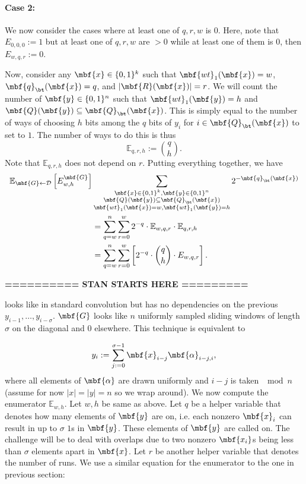 \paragraph{Case 2:} We now consider the cases where at least one of $q,r,w$ is $0$. Here, note that $E_{0,0,0} := 1$ but at least one of $q,r,w$ are $> 0$ while at least one of them is $0$, then $E_{w,q,r} := 0$.  

Now, consider any $\mbf{x} \in \{0,1\}^{k}$ such that $\mbf{wt}_1(\mbf{x}) = w$, $\mbf{q}_{\bt}(\mbf{x}) = q$, and $|\mbf{R}(\mbf{x})| = r$. We will count the number of $\mbf{y} \in \{0,1\}^n$ such that $\mbf{wt}_1(\mbf{y}) = h$ and $\mbf{Q}(\mbf{y}) \subseteq \mbf{Q}_{\bt}(\mbf{x})$. This is simply equal to the number of ways of choosing $h$ bits among the $q$ bits of $y_i$ for $i\in \mbf{Q}_{\bt}(\mbf{x})$ to set to $1$. The number of ways to do this is thus$$\mathbb{E}_{q,r,h} := { q \choose h }.$$Note that $\mathbb{E}_{q,r,h}$ does not depend on $r$. Putting everything together, we have
\begin{align*}
\mathbb{E}_{\mbf{G} \gets \mathcal{D}}\left[E^{\mbf{G}}_{w,h}\right]&\sum_{\substack{\mbf{x} \in \{0,1\}^k, \mbf{y} \in \{0,1\}^n\\\mbf{Q}(\mbf{y}) \subseteq \mbf{Q}_{\bt}(\mbf{x})\\\mbf{wt}_1(\mbf{x}) = w,\mbf{wt}_1(\mbf{y}) = h}}2^{-\mbf{q}_{\bt}(\mbf{x})}\\
&=\sum_{q=w}^{n}\sum_{r=0}^{w}2^{-q} \cdot \mathbb{E}_{w,q,r} \cdot\mathbb{E}_{q,r,h}\\
&=\sum_{q=w}^{n}\sum_{r=0}^{w}\left[2^{-q} \cdot{q \choose h }\cdot E_{w,q,r}\right].
\end{align*}

\iffalse
\newpage
\textbf{========== STAN STARTS HERE =========}

looks like in standard convolution but has no dependencies on the previous $y_{i-1}, \ldots, y_{i-\sigma}$. $\mbf{G}$ looks like $n$ uniformly sampled sliding windows of length $\sigma$ on the diagonal and $0$ elsewhere. This technique is equivalent to

$$y_i := \sum_{j:=0}^{\sigma-1}\mbf{x}_{i-j}\mbf{\alpha}_{i - j,i},$$
where all elements of $\mbf{\alpha}$ are drawn uniformly and $i-j$ is taken $\mod n$ (assume for now $|x|=|y|=n$ so we wrap around). We now compute the enumerator $\mathbb{E}_{w,h}$. Let $w,h$ be same as above. Let $q$ be a helper variable that denotes how many elements of $\mbf{y}$ are on, i.e. each nonzero $\mbf{x}_i$ can result in up to $\sigma$ $1$s in $\mbf{y}$. These elements of $\mbf{y}$ are called on. The challenge will be to deal with overlaps due to two nonzero $\mbf{x_i}$s being less than $\sigma$ elements apart in $\mbf{x}$.
Let $r$ be another helper variable that denotes the number of runs.
We use a similar equation for the enumerator to the one in previous section:

